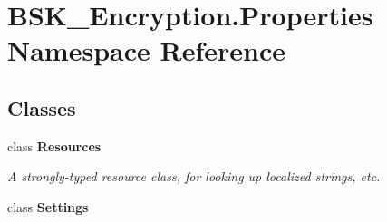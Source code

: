 \hypertarget{namespace_b_s_k___encryption_1_1_properties}{}\section{B\+S\+K\+\_\+\+Encryption.\+Properties Namespace Reference}
\label{namespace_b_s_k___encryption_1_1_properties}
\subsection*{Classes}
\begin{DoxyCompactItemize}
\item 
class {\bfseries Resources}
\begin{DoxyCompactList}\small\item\em A strongly-\/typed resource class, for looking up localized strings, etc. \end{DoxyCompactList}\item 
class {\bfseries Settings}
\end{DoxyCompactItemize}
